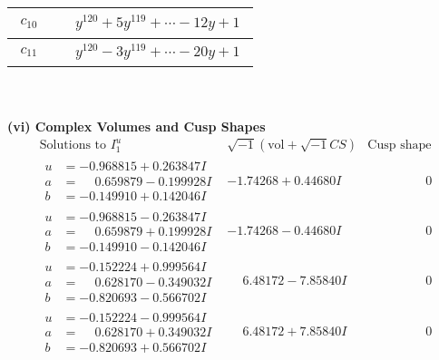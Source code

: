 \documentclass[1p]{elsarticle_modified}
\theoremstyle{definition}
\newcommand{\I}{\sqrt{-1}}
\begin{document}
\begin{tabular}{m{50pt}|m{274pt}}
\hline $$\begin{aligned}c_{10}\end{aligned}$$&$\begin{aligned}
&y^{120}+5 y^{119}+\cdots-12 y+1
\end{aligned}$\\
\hline $$\begin{aligned}c_{11}\end{aligned}$$&$\begin{aligned}
&y^{120}-3 y^{119}+\cdots-20 y+1
\end{aligned}$\\
\hline
\end{tabular}\\~\\
\newpage\flushleft \textbf{(vi) Complex Volumes and Cusp Shapes}
$$\begin{array}{c|c|c}  
\text{Solutions to }I^u_{1}& \I (\text{vol} + \sqrt{-1}CS) & \text{Cusp shape}\\
 \hline 
\begin{aligned}
u &= -0.968815 + 0.263847 I \\
a &= \phantom{-}0.659879 - 0.199928 I \\
b &= -0.149910 + 0.142046 I\end{aligned}
 & -1.74268 + 0.44680 I & \phantom{-0.000000 } 0 \\ \hline\begin{aligned}
u &= -0.968815 - 0.263847 I \\
a &= \phantom{-}0.659879 + 0.199928 I \\
b &= -0.149910 - 0.142046 I\end{aligned}
 & -1.74268 - 0.44680 I & \phantom{-0.000000 } 0 \\ \hline\begin{aligned}
u &= -0.152224 + 0.999564 I \\
a &= \phantom{-}0.628170 - 0.349032 I \\
b &= -0.820693 - 0.566702 I\end{aligned}
 & \phantom{-}6.48172 - 7.85840 I & \phantom{-0.000000 } 0 \\ \hline\begin{aligned}
u &= -0.152224 - 0.999564 I \\
a &= \phantom{-}0.628170 + 0.349032 I \\
b &= -0.820693 + 0.566702 I\end{aligned}
 & \phantom{-}6.48172 + 7.85840 I & \phantom{-0.000000 } 0 \\ \hline\begin{aligned}

\end{aligned}
\end{array}$$
\end{document}
